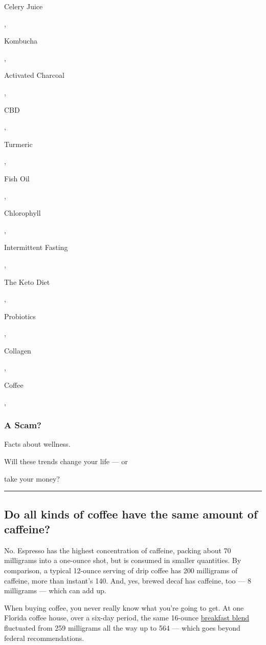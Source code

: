 Celery Juice

,

Kombucha

,

Activated Charcoal

,

CBD

,

Turmeric

,

Fish Oil

,

Chlorophyll

,

Intermittent Fasting

,

The Keto Diet

,

Probiotics

,

Collagen

,

Coffee

,

\hypertarget{a-scam}{%
\subsubsection{A Scam?}\label{a-scam}}

Facts about wellness.

Will these trends change your life --- or

take your money?

\begin{center}\rule{0.5\linewidth}{\linethickness}\end{center}

\hypertarget{do-all-kinds-of-coffee-have-the-same-amount-of-caffeine}{%
\subsection{Do all kinds of coffee have the same amount of
caffeine?}\label{do-all-kinds-of-coffee-have-the-same-amount-of-caffeine}}

No. Espresso has the highest concentration of caffeine, packing about 70
milligrams into a one-ounce shot, but is consumed in smaller quantities.
By comparison, a typical 12-ounce serving of drip coffee has 200
milligrams of caffeine, more than instant's 140. And, yes, brewed decaf
has caffeine, too --- 8 milligrams --- which can add up.

When buying coffee, you never really know what you're going to get. At
one Florida coffee house, over a six-day period, the same 16-ounce
\href{https://academic.oup.com/jat/article/27/7/520/784168}{breakfast
blend} fluctuated from 259 milligrams all the way up to 564 --- which
goes beyond federal recommendations.

